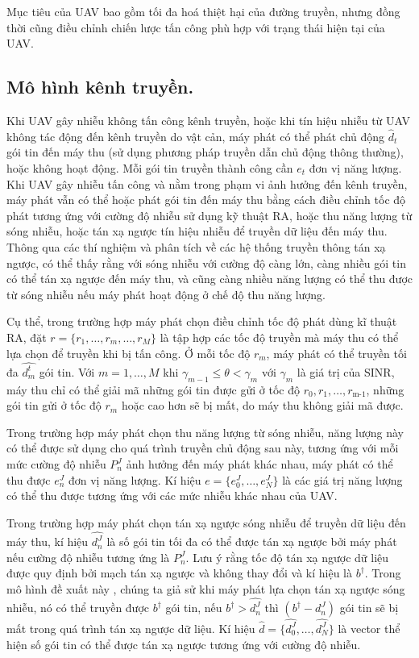 \documentclass{uetgraduation}
\begin{document}
Mục tiêu của UAV bao gồm tối đa hoá thiệt hại của đường truyền, nhưng đồng thời cũng điều chỉnh chiến lược tấn công phù hợp với trạng thái hiện tại của UAV.

\subsection{Mô hình kênh truyền.}
Khi UAV gây nhiễu không tấn công kênh truyền, hoặc khi tín hiệu nhiễu từ UAV không tác động đến kênh truyền do vật cản, máy phát có thể phát chủ động $\hat{d}_t$
gói tin đến máy thu (sử dụng phương pháp truyền dẫn chủ động thông thường), hoặc không hoạt động. Mỗi gói tin truyền thành công cần $e_t$ đơn vị năng lượng.
Khi UAV gây nhiễu tấn công và nằm trong phạm vi ảnh hưởng đến kênh truyền, máy phát vẫn có thể hoặc phát gói tin đến máy thu bằng cách điều chỉnh tốc độ phát tương
ứng với cường độ nhiễu sử dụng kỹ thuật RA, hoặc thu năng lượng từ sóng nhiễu, hoặc tán xạ ngược tín hiệu nhiễu để truyền dữ liệu đến máy thu. Thông qua các thí nghiệm
và phân tích về các hệ thống truyền thông tán xạ ngược, có thể thấy rằng với sóng nhiễu với cường độ càng lớn, càng nhiều gói tin có thể tán xạ ngược đến máy thu, và cũng
càng nhiều năng lượng có thể thu được từ sóng nhiễu nếu máy phát hoạt động ở chế độ thu năng lượng. 

Cụ thể, trong trường hợp máy
phát chọn điều chỉnh tốc độ phát dùng kĩ thuật RA, đặt $r = \{r_1, \dots, r_m,\dots, r_M\}$ là tập hợp các tốc độ truyền mà máy thu có thể lựa chọn để truyền khi bị tấn
công. Ở mỗi tốc độ $r_m$, máy phát có thể truyền tối đa $\hat{d_m^t}$ gói tin. Với $m = 1, \dots, M$ khi $\gamma_{m-1} \leq \theta < \gamma_m$ với $\gamma_m$ là giá
trị của SINR, máy thu chỉ có thể giải mã những gói tin được gửi ở tốc độ $r_0, r_1, \dots, r_\text{m-1}$, những gói tin gửi ở tốc độ $r_m$ hoặc cao hơn sẽ bị mất,
do máy thu không giải mã được. 

Trong trường hợp máy phát chọn thu năng lượng từ sóng nhiễu, năng lượng này có thể được sử dụng cho quá trình truyền chủ động sau này, tương ứng với mỗi mức cường độ nhiễu $P_n^J$
ảnh hưởng đến máy phát khác nhau, máy phát có thể thu được $e_n^J$ đơn vị năng lượng. Kí hiệu $e = \{e_0^J, \dots, e_N^J\}$ là các giá trị năng lượng có thể thu được tương ứng
với các mức nhiễu khác nhau của UAV.

Trong trường hợp máy phát chọn tán xạ ngược sóng nhiễu để truyền dữ liệu đến máy thu, kí hiệu $\hat{d_n^J}$ là số gói tin tối đa có thể được tán xạ ngược bởi máy phát nếu
cường độ nhiễu tương ứng là $P_n^J$. Lưu ý rằng tốc độ tán xạ ngược dữ liệu được quy định bởi mạch tán xạ ngược và không thay đổi và kí hiệu là $b^{\dagger}$. Trong mô hình đề xuất này
, chúng ta giả sử khi máy phát lựa chọn tán xạ ngược sóng nhiễu, nó có thể truyền được $b^{\dagger}$ gói tin, nếu $b^{\dagger} > \hat{d_n^J}$ thì $(b^{\dagger} - d_n^J)$ gói tin sẽ bị mất trong
quá trình tán xạ ngược dữ liệu. Kí hiệu $\hat{d} = \{\hat{d_0^J}, \dots, \hat{d_N^J}\}$ là vector thể hiện số gói tin có thể được tán xạ ngược tương ứng với cường độ nhiễu.
\end{document}
